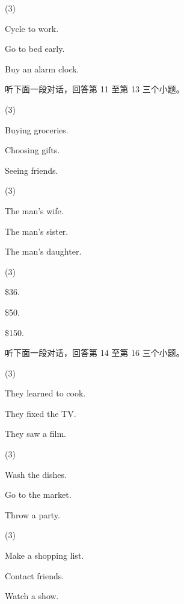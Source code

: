 \documentclass{英语试卷}
\begin{document}
\begin{choices}(3)
  \item Cycle to work.
  \item Go to bed early.
  \item Buy an alarm clock.
\end{choices}
\par 听下面一段对话，回答第 11 至第 13 三个小题。\par
{}
\begin{choices}(3)
  \item Buying groceries.
  \item Choosing gifts.
  \item Seeing friends.
\end{choices}
\begin{choices}(3)
  \item The man's wife.
  \item The man's sister.
  \item The man's daughter.
\end{choices}
\begin{choices}(3)
  \item \$36.
  \item \$50.
  \item \$150.
\end{choices}
\par 听下面一段对话，回答第 14 至第 16 三个小题。\par
{}
\begin{choices}(3)
  \item They learned to cook.
  \item They fixed the TV.
  \item They saw a film.
\end{choices}
\begin{choices}(3)
  \item Wash the dishes.
  \item Go to the market.
  \item Throw a party.
\end{choices}
\begin{choices}(3)
  \item Make a shopping list.
  \item Contact friends.
  \item Watch a show.
\end{choices}
\end{document}
